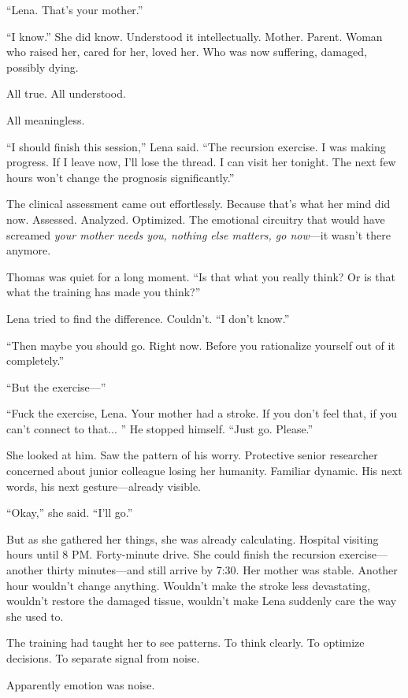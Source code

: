 ``Lena. That's your mother.''

``I know.'' She did know. Understood it intellectually. Mother. Parent. Woman who raised her, cared for her, loved her. Who was now suffering, damaged, possibly dying.

All true. All understood.

All meaningless.

``I should finish this session,'' Lena said. ``The recursion exercise. I was making progress. If I leave now, I'll lose the thread. I can visit her tonight. The next few hours won't change the prognosis significantly.''

The clinical assessment came out effortlessly. Because that's what her mind did now. Assessed. Analyzed. Optimized. The emotional circuitry that would have screamed \textit{your mother needs you, nothing else matters, go now}—it wasn't there anymore.

Thomas was quiet for a long moment. ``Is that what you really think? Or is that what the training has made you think?''

Lena tried to find the difference. Couldn't. ``I don't know.''

``Then maybe you should go. Right now. Before you rationalize yourself out of it completely.''

``But the exercise—''

``Fuck the exercise, Lena. Your mother had a stroke. If you don't feel that, if you can't connect to that... '' He stopped himself. ``Just go. Please.''

She looked at him. Saw the pattern of his worry. Protective senior researcher concerned about junior colleague losing her humanity. Familiar dynamic. His next words, his next gesture---already visible.

``Okay,'' she said. ``I'll go.''

But as she gathered her things, she was already calculating. Hospital visiting hours until 8 PM. Forty-minute drive. She could finish the recursion exercise—another thirty minutes—and still arrive by 7:30. Her mother was stable. Another hour wouldn't change anything. Wouldn't make the stroke less devastating, wouldn't restore the damaged tissue, wouldn't make Lena suddenly care the way she used to.

The training had taught her to see patterns. To think clearly. To optimize decisions. To separate signal from noise.

Apparently emotion was noise.

